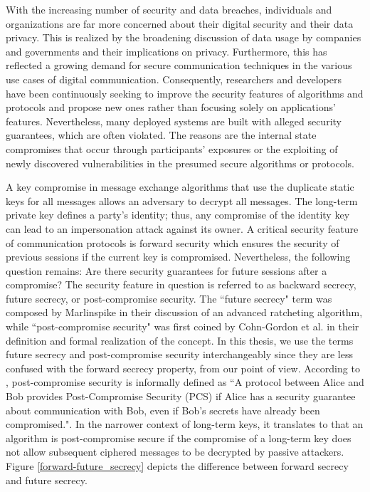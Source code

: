 With the increasing number of security and data breaches, individuals and organizations are far more concerned about their digital security and their data privacy. This is realized by the broadening discussion of data usage by companies and governments and their implications on privacy. Furthermore, this has reflected a growing demand for secure communication techniques in the various use cases of digital communication. Consequently, researchers and developers have been continuously seeking to improve the security features of algorithms and protocols and propose new ones rather than focusing solely on applications' features. Nevertheless, many deployed systems are built with alleged security guarantees, which are often violated. The reasons are the internal state compromises that occur through participants' exposures or the exploiting of newly discovered vulnerabilities in the presumed secure algorithms or protocols.
\par
A key compromise in message exchange algorithms that use the duplicate static keys for all messages allows an adversary to decrypt all messages. The long-term private key defines a party’s identity; thus, any compromise of the identity key can lead to an impersonation attack against its owner. A critical security feature of communication protocols is forward security which ensures the security of previous sessions if the current key is compromised. Nevertheless, the following question remains: Are there security guarantees for future sessions after a compromise? The security feature in question is referred to as backward secrecy, future secrecy, or post-compromise security. The ``future secrecy" term was composed by Marlinspike \cite{advanced_cryptographic_ratcheting_2013} in their discussion of an advanced ratcheting algorithm, while ``post-compromise security" was first coined by Cohn-Gordon et al. \cite{cohn2016post} in their definition and formal realization of the concept. In this thesis, we use the terms future secrecy and post-compromise security interchangeably since they are less confused with the forward secrecy property, from our point of view. According to \cite{cohn2016post}, post-compromise security is informally defined as ``A protocol between Alice and Bob provides Post-Compromise Security (PCS) if Alice has a security guarantee about communication with Bob, even if Bob’s secrets have already been compromised.". In the narrower context of long-term keys, it translates to that an algorithm is post-compromise secure if the compromise of a long-term key does not allow subsequent ciphered messages to be decrypted by passive attackers. Figure \ref{forward-future_secrecy} depicts the difference between forward secrecy and future secrecy.
